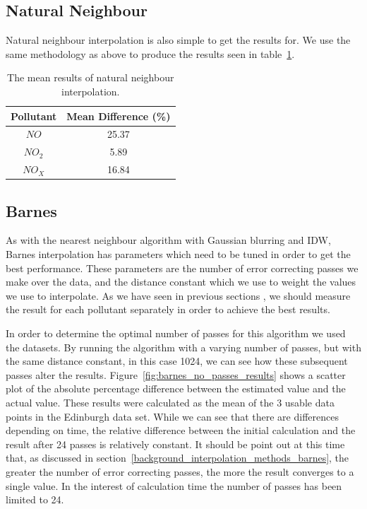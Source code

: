         \subsection{Natural Neighbour}\label{prediction_evaluation_results_natural_neighbour}

        	Natural neighbour interpolation is also simple to get the results for. We use the same methodology as above to produce the results seen in table~\ref{tab:natural_neighbour_results}.

        	\begin{table}[H]
				\centering
	    		\begin{tabular}{|c|c|}
	    			\hline
					Pollutant & Mean Difference (\%) \\ \hline
					$NO$ & 25.37 \\
					$NO_{2}$ & 5.89 \\
					$NO_{X}$ & 16.84 \\
					\hline
				\end{tabular}
				\caption{The mean results of natural neighbour interpolation.}
				\label{tab:natural_neighbour_results}
			\end{table} 


        \subsection{Barnes}\label{prediction_evaluation_results_barnes}

        	As with the nearest neighbour algorithm with Gaussian blurring and IDW, Barnes interpolation has parameters which need to be tuned in order to get the best performance. These parameters are the number of error correcting passes we make over the data, and the distance constant which we use to weight the values we use to interpolate. As we have seen in previous sections , we should measure the result for each pollutant separately in order to achieve the best results. 


        	In order to determine the optimal number of passes for this algorithm we used the datasets. By running the algorithm with a varying number of passes, but with the same distance constant, in this case 1024, we can see how these subsequent passes alter the results. Figure~\ref{fig:barnes_no_passes_results} shows a scatter plot of the absolute percentage difference between the estimated value and the actual value. These results were calculated as the mean of the 3 usable data points in the Edinburgh data set. While we can see that there are differences depending on time, the relative difference between the initial calculation and the result after 24 passes is relatively constant. It should be point out at this time that, as discussed in section~\ref{background_interpolation_methods_barnes}, the greater the number of error correcting passes, the more the result converges to a single value. In the interest of calculation time the number of passes has been limited to 24. 

